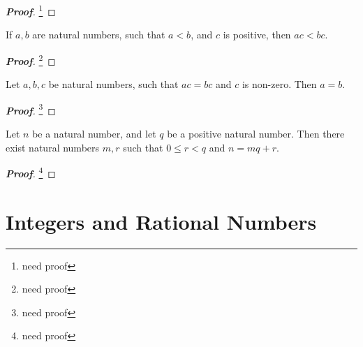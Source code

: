 \begin{proof}[\bf Proof]
\footnote{need proof}
\end{proof}

\begin{proposition}
If $a,b$ are natural numbers, such that $a<b$, and $c$ is positive, then $ac < bc$.
\end{proposition}

\begin{proof}[\bf Proof]
\footnote{need proof}
\end{proof}

\begin{corollary}
Let $a,b,c$ be natural numbers, such that $ac = bc$ and $c$ is non-zero. Then $a = b$.
\end{corollary}

\begin{proof}[\bf Proof]
\footnote{need proof}
\end{proof}

\begin{proposition}
Let $n$ be a natural number, and let $q$ be a positive natural number. Then there exist natural numbers $m,r$ such that $0\leq r<q$ and $n = mq +r$.
\end{proposition}

\begin{proof}[\bf Proof]
\footnote{need proof}
\end{proof}



\section{Integers and Rational Numbers}

